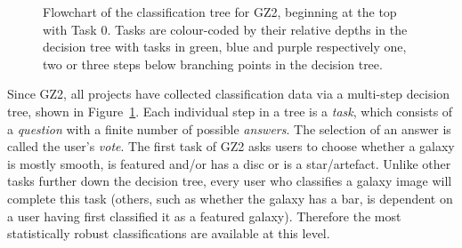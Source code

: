 \begin{figure}
\caption[GZ2 classification decision tree]{Flowchart of the classification tree for GZ2, beginning at the top with Task 0. Tasks are colour-coded by their relative depths in the decision tree with tasks in green, blue and purple respectively one, two or three steps below branching points in the decision tree.}
\label{fig:gztree}
\end{figure}

Since GZ2, all projects have collected classification data via a multi-step decision tree, shown in Figure~\ref{fig:gztree}.  Each individual step in a tree is a \emph{task}, which consists of a \emph{question} with a finite number of possible \emph{answers}. The selection of an answer is called the user's \emph{vote}. The first task of GZ2 asks users to choose whether a galaxy is mostly smooth, is featured and/or has a disc or is a star/artefact. Unlike other tasks further down the decision tree, every user who classifies a galaxy image will complete this task (others, such as whether the galaxy has a bar, is dependent on a user having first classified it as a featured galaxy). Therefore the most statistically robust classifications are available at this level.

